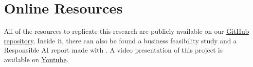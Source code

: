 \section{Online Resources}

All of the resources to replicate this research are publicly available on our
\href{https://github.com/emanuelemessina/broken-morals}{GitHub repository}.
Inside it, there can also be found a business feasibility study and a Responsible AI report made with \cite{constantinides2024raiguidelinesmethodgenerating}.
A video presentation of this project is available on \href{TODO}{Youtube}.
